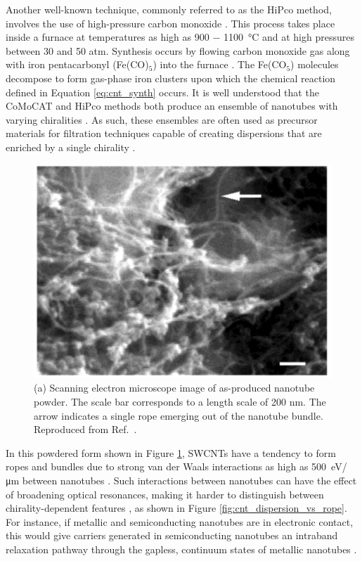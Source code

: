 Another well-known technique, commonly referred to as the HiPco method, involves the use of high-pressure carbon monoxide \cite{bronikowski2001gas, nikolaev1999gas}. This process takes place inside a furnace at temperatures as high as 900 $-$ \SI{1100}{\celsius} and at high pressures between 30 and 50 atm. Synthesis occurs by flowing carbon monoxide gas along with iron pentacarbonyl (Fe(CO)$_5$) into the furnace \cite{nikolaev1999gas}. The Fe(CO$_5$) molecules decompose to form gas-phase iron clusters upon which the chemical reaction defined in Equation \eqref{eq:cnt_synth} occurs. It is well understood that the CoMoCAT and HiPco methods both produce an ensemble of nanotubes with varying chiralities \cite{agboola2007conceptual}. As such, these ensembles are often used as precursor materials for filtration techniques capable of creating dispersions that are enriched by a single chirality \cite{janas2018towards, zheng2019sorting}.

\begin{figure}[ht]
	\centering
	\includegraphics[scale=0.3]{images/chapter_methods/sem_cnt_powder_bandy}
	\caption{(a) Scanning electron microscope image of as-produced nanotube powder. The scale bar corresponds to a length scale of 200 nm. The arrow indicates a single rope emerging out of the nanotube bundle. Reproduced from Ref.\ \cite{bandyopadhyaya2002stabilization}.}
	\label{fig:cnt_powder}
\end{figure}


In this powdered form shown in Figure \ref{fig:cnt_powder}, SWCNTs have a tendency to form ropes and bundles due to strong van der Waals interactions as high as \SI{500}{\electronvolt / \micro \meter} between nanotubes \cite{thess1996crystalline, girifalco2000carbon}. Such interactions between nanotubes can have the effect of broadening optical resonances, making it harder to distinguish between chirality-dependent features \cite{liu1998fullerene, o2001reversible, o2002band}, as shown in Figure \ref{fig:cnt_dispersion_vs_rope}. For instance, if metallic and semiconducting nanotubes are in electronic contact, this would give carriers generated in semiconducting nanotubes an intraband relaxation pathway through the gapless, continuum states of metallic nanotubes \cite{ostojic2004interband}.



